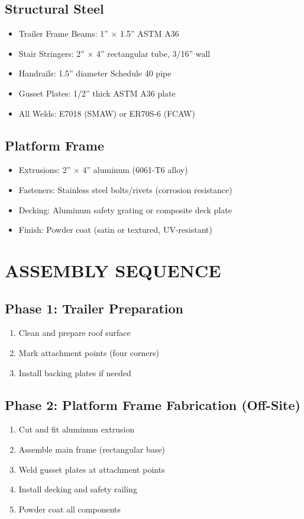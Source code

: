 \documentclass[11pt,letter]{article}
\begin{document}
\subsection{Structural Steel}
\begin{itemize}
  \item Trailer Frame Beams: 1'' × 1.5'' ASTM A36
  \item Stair Stringers: 2'' × 4'' rectangular tube, 3/16'' wall
  \item Handrails: 1.5'' diameter Schedule 40 pipe
  \item Gusset Plates: 1/2'' thick ASTM A36 plate
  \item All Welds: E7018 (SMAW) or ER70S-6 (FCAW)
\end{itemize}

\subsection{Platform Frame}
\begin{itemize}
  \item Extrusions: 2'' × 4'' aluminum (6061-T6 alloy)
  \item Fasteners: Stainless steel bolts/rivets (corrosion resistance)
  \item Decking: Aluminum safety grating or composite deck plate
  \item Finish: Powder coat (satin or textured, UV-resistant)
\end{itemize}

\section{ASSEMBLY SEQUENCE}

\subsection{Phase 1: Trailer Preparation}
\begin{enumerate}
  \item Clean and prepare roof surface
  \item Mark attachment points (four corners)
  \item Install backing plates if needed
\end{enumerate}

\subsection{Phase 2: Platform Frame Fabrication (Off-Site)}
\begin{enumerate}
  \item Cut and fit aluminum extrusion
  \item Assemble main frame (rectangular base)
  \item Weld gusset plates at attachment points
  \item Install decking and safety railing
  \item Powder coat all components
\end{enumerate}
\end{document}
